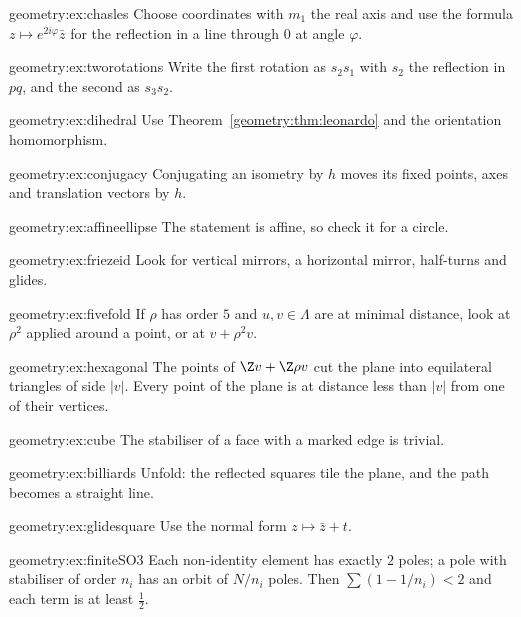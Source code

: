 \begin{hint}{geometry:ex:chasles}
Choose coordinates with $m_1$ the real axis and use the formula $z\mapsto e^{2i\varphi}\bar z$ for the reflection in a line through $0$
at angle $\varphi$.
\end{hint}
\begin{hint}{geometry:ex:tworotations}
Write the first rotation as $s_2s_1$ with $s_2$ the reflection in $pq$, and the second as $s_3s_2$.
\end{hint}
\begin{hint}{geometry:ex:dihedral}
Use Theorem~\ref{geometry:thm:leonardo} and the orientation homomorphism.
\end{hint}
\begin{hint}{geometry:ex:conjugacy}
Conjugating an isometry by $h$ moves its fixed points, axes and translation vectors by $h$.
\end{hint}
\begin{hint}{geometry:ex:affineellipse}
The statement is affine, so check it for a circle.
\end{hint}
\begin{hint}{geometry:ex:friezeid}
Look for vertical mirrors, a horizontal mirror, half-turns and glides.
\end{hint}
\begin{hint}{geometry:ex:fivefold}
If $\rho$ has order $5$ and $u,v\in\Lambda$ are at minimal distance, look at $\rho^2$ applied around a point, or at $v+\rho^2v$.
\end{hint}
\begin{hint}{geometry:ex:hexagonal}
The points of $\Z v+\Z\rho v$ cut the plane into equilateral triangles of side $|v|$. Every point of the plane is at distance less than
$|v|$ from one of their vertices.
\end{hint}
\begin{hint}{geometry:ex:cube}
The stabiliser of a face with a marked edge is trivial.
\end{hint}
\begin{hint}{geometry:ex:billiards}
Unfold: the reflected squares tile the plane, and the path becomes a straight line.
\end{hint}
\begin{hint}{geometry:ex:glidesquare}
Use the normal form $z\mapsto\bar z+t$.
\end{hint}
\begin{hint}{geometry:ex:finiteSO3}
Each non-identity element has exactly $2$ poles; a pole with stabiliser of order $n_i$ has an orbit of $N/n_i$ poles. Then
$\sum(1-1/n_i)<2$ and each term is at least $\frac12$.
\end{hint}

